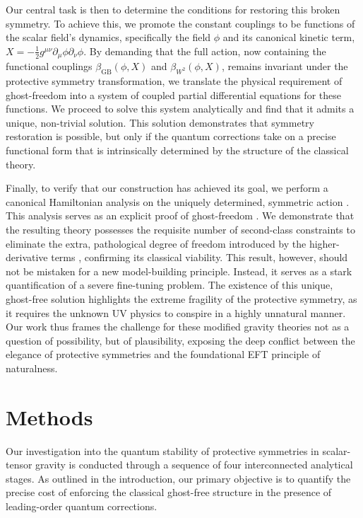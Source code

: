 \documentclass[twocolumn]{aastex631}
\begin{document}
Our central task is then to determine the conditions for restoring this broken symmetry. To achieve this, we promote the constant couplings to be functions of the scalar field's dynamics, specifically the field $\phi$ and its canonical kinetic term, $X = -\frac{1}{2}g^{\mu\nu}\partial_\mu\phi\partial_\nu\phi$. By demanding that the full action, now containing the functional couplings $\beta_{\text{GB}}(\phi, X)$ and $\beta_{W^2}(\phi, X)$, remains invariant under the protective symmetry transformation, we translate the physical requirement of ghost-freedom into a system of coupled partial differential equations for these functions. We proceed to solve this system analytically and find that it admits a unique, non-trivial solution. This solution demonstrates that symmetry restoration is possible, but only if the quantum corrections take on a precise functional form that is intrinsically determined by the structure of the classical theory.

Finally, to verify that our construction has achieved its goal, we perform a canonical Hamiltonian analysis on the uniquely determined, symmetric action \citep{molaee2021hamiltonianformalismghostfree,escalante2024hamiltoniananalysisperturbativelambda}. This analysis serves as an explicit proof of ghost-freedom \citep{molaee2021hamiltonianformalismghostfree,gomes2024pathologicalcharactermodificationscoincident}. We demonstrate that the resulting theory possesses the requisite number of second-class constraints to eliminate the extra, pathological degree of freedom introduced by the higher-derivative terms \citep{molaee2021hamiltonianformalismghostfree,escalante2024hamiltoniananalysisperturbativelambda}, confirming its classical viability. This result, however, should not be mistaken for a new model-building principle. Instead, it serves as a stark quantification of a severe fine-tuning problem. The existence of this unique, ghost-free solution highlights the extreme fragility of the protective symmetry, as it requires the unknown UV physics to conspire in a highly unnatural manner. Our work thus frames the challenge for these modified gravity theories not as a question of possibility, but of plausibility, exposing the deep conflict between the elegance of protective symmetries and the foundational EFT principle of naturalness.

\section{Methods}
\label{sec:methods}
Our investigation into the quantum stability of protective symmetries in scalar-tensor gravity is conducted through a sequence of four interconnected analytical stages. As outlined in the introduction, our primary objective is to quantify the precise cost of enforcing the classical ghost-free structure in the presence of leading-order quantum corrections.
\end{document}
